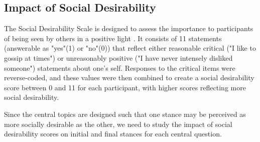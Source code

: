 \documentclass{scrartcl}
\begin{document}
\subsection{Impact of Social Desirability}
The Social Desirability Scale is designed to assess the importance to participants of being seen by others in a positive light \cite{social-desirability}. It consists of 11 statements (answerable as "yes"(1) or "no"(0)) that reflect either reasonable critical ("I like to gossip at times") or unreasonably positive ("I have never intensely disliked someone") statements about one's self. Responses to the critical items were reverse-coded, and these values were then combined to create a social desirability score between 0 and 11 for each participant, with higher scores reflecting more social desirability.

Since the central topics are designed such that one stance may be perceived as more socially desirable as the other, we need to study the impact of social desirability scores on initial and final stances for each central question.
\end{document}
